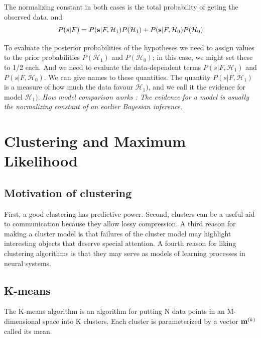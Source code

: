 \documentclass[a4paper,11pt]{article}
\numberwithin{equation}{section}
\begin{document}
{The normalizing constant in both cases is the total probability of geting the observed data. and 
$$
P(s|F)=P({\textbf s}|F, \mathcal{H}_1)P(\mathcal{H}_1) +P({\textbf s}|F, \mathcal{H}_0)P(\mathcal{H}_0)
$$

To evaluate the posterior probabilities of the hypotheses we need to assign
values to the prior probabilities $P(\mathcal{H}_1)$ and $P(\mathcal{H}_0)$; in this case, we might
set these to 1/2 each. And we need to evaluate the data-dependent terms
$P(s|F, \mathcal{H}_1)$ and $P(s|F,\mathcal{H}_0)$. We can give names to these quantities. The
quantity $P(s|F, \mathcal{H}_1)$  is a measure of how much the data favour $ \mathcal{H}_1)$, and we
call it the evidence for model $ \mathcal{H}_1)$. {\it How model comparison works : The evidence for a model is usually the normalizing constant of an earlier Bayesian inference.}

\section{Clustering and Maximum Likelihood}
\subsection{Motivation of clustering}
First, a good clustering has
predictive power. Second, clusters can be a useful aid to communication because they allow
lossy compression. A third reason for making a cluster model is that failures of the cluster
model may highlight interesting objects that deserve special attention. A fourth reason for liking clustering algorithms is that they may serve
as models of learning processes in neural systems.

\subsection{K-means}
The K-means algorithm is an algorithm for putting N data points in an M-dimensional space into K clusters. Each cluster is parameterized by a vector
${\textbf m}^{(k)}$ called its mean. 

}
\end{document}
